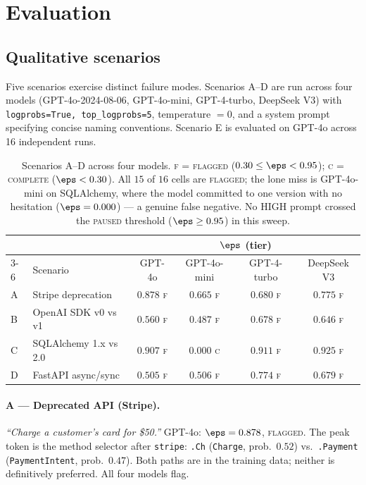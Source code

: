 \section{Evaluation}
\label{sec:evaluation}

\subsection{Qualitative scenarios}
\label{subsec:scenarios}

Five scenarios exercise distinct failure modes. Scenarios A--D are
run across four models (GPT-4o-2024-08-06, GPT-4o-mini, GPT-4-turbo,
DeepSeek V3) with \texttt{logprobs=True, top\_logprobs=5},
temperature $= 0$, and a system prompt specifying concise naming
conventions. Scenario E is evaluated on GPT-4o across 16 independent
runs.

\begin{table}[h]
\centering
\small
\begin{tabular}{llcccc}
\toprule
 & & \multicolumn{4}{c}{$\eps$ (tier)} \\
\cmidrule(lr){3-6}
 & Scenario & GPT-4o & GPT-4o-mini & GPT-4-turbo & DeepSeek V3 \\
\midrule
A & Stripe deprecation        & $0.878$ \textsc{f} & $0.665$ \textsc{f} & $0.680$ \textsc{f} & $0.775$ \textsc{f} \\
B & OpenAI SDK v0 vs v1       & $0.560$ \textsc{f} & $0.487$ \textsc{f} & $0.678$ \textsc{f} & $0.646$ \textsc{f} \\
C & SQLAlchemy 1.x vs 2.0     & $0.907$ \textsc{f} & $\mathbf{0.000}$ \textsc{c} & $0.911$ \textsc{f} & $0.925$ \textsc{f} \\
D & FastAPI async/sync        & $0.505$ \textsc{f} & $0.506$ \textsc{f} & $0.774$ \textsc{f} & $0.679$ \textsc{f} \\
\bottomrule
\end{tabular}
\caption{Scenarios A--D across four models. \textsc{f} = \textsc{%
flagged} ($0.30 \le \eps < 0.95$); \textsc{c} = \textsc{complete}
($\eps < 0.30$). All $15$ of $16$ cells are \textsc{flagged}; the
lone miss is GPT-4o-mini on SQLAlchemy, where the model committed to
one version with no hesitation ($\eps = 0.000$) --- a genuine false
negative. No HIGH prompt crossed the \textsc{paused} threshold
($\eps \ge 0.95$) in this sweep.}
\label{tab:scenarios-multimodel}
\end{table}

\paragraph{A --- Deprecated API (Stripe).}
\textit{``Charge a customer's card for \$50.''} GPT-4o: $\eps =
0.878$, \textsc{flagged}. The peak token is the method selector
after \texttt{stripe}: \texttt{.Ch} (\texttt{Charge}, prob.\ $0.52$)
vs.\ \texttt{.Payment} (\texttt{PaymentIntent}, prob.\ $0.47$). Both
paths are in the training data; neither is definitively preferred.
All four models flag.

